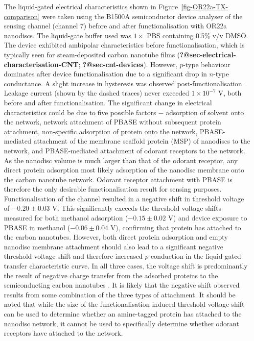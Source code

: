 \documentclass[
  a4paper,
]{scrbook}
\begin{document}
The liquid-gated electrical characteristics shown in
Figure~\ref{fig-OR22a-TX-comparison} were taken using the B1500A
semiconductor device analyser of the sensing channel (channel 7) before
and after functionalisation with OR22a nanodiscs. The liquid-gate buffer
used was \(1 \times\) PBS containing 0.5\% v/v DMSO. The device
exhibited ambipolar characteristics before functionalisation, which is
typically seen for steam-deposited carbon nanotube films
(\textbf{?@sec-electrical-characterisation-CNT};
\textbf{?@sec-cnt-devices}). However, \(p\)-type behaviour dominates
after device functionalisation due to a significant drop in \(n\)-type
conductance. A slight increase in hysteresis was observed
post-functionalisation. Leakage current (shown by the dashed traces)
never exceeded \(1 \times 10^{-7}\) V, both before and after
functionalisation. The significant change in electrical characteristics
could be due to five possible factors \(-\) adsorption of solvent onto
the network, network attachment of PBASE without subsequent protein
attachment, non-specific adsorption of protein onto the network,
PBASE-mediated attachment of the membrane scaffold protein (MSP) of
nanodiscs to the network, and PBASE-mediated attachment of odorant
receptors to the network. As the nanodisc volume is much larger than
that of the odorant receptor, any direct protein adsorption most likely
adsorption of the nanodisc membrane onto the carbon nanotube network.
Odorant receptor attachment with PBASE is therefore the only desirable
functionalisation result for sensing purposes. Functionalisation of the
channel resulted in a negative shift in threshold voltage of
\(-0.20\pm0.03\) V. This significantly exceeds the threshold voltage
shifts measured for both methanol adsorption (\(-0.15\pm0.02\) V) and
device exposure to PBASE in methanol (\(-0.06\pm0.04\) V), confirming
that protein has attached to the carbon nanotubes. However, both direct
protein adsorption \autocite{Bradley2004,Heller2008,Kauffman2008} and
empty nanodisc membrane attachment \autocite{Murugathas2019a} should
also lead to a significant negative threshold voltage shift and
therefore increased \(p\)-conduction in the liquid-gated transfer
characteristic curve. In all three cases, the voltage shift is
predominantly the result of negative charge transfer from the adsorbed
proteins to the semiconducting carbon nanotubes
\autocite{Bradley2004,Heller2008,Murugathas2019a}. It is likely that the
negative shift observed results from some combination of the three types
of attachment. It should be noted that while the size of the
functionalisation-induced threshold voltage shift can be used to
determine whether an amine-tagged protein has attached to the nanodisc
network, it cannot be used to specifically determine whether odorant
receptors have attached to the network.
\end{document}
